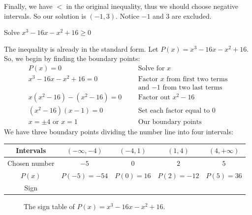 Finally, we have $<$ in the original inequality, thus we should choose negative intervals. So our solution is $(-1,3)$. Notice $-1$ and $3$ are excluded.
\begin{exa}
    Solve $x^3-16x-x^2+16 \ge 0$
\end{exa}
The inequality is already in the standard form. Let $P(x)=x^3-16x-x^2+16$. So, we begin by finding the boundary points:
\begin{align*}
        P(x) = 0&       &   &\text{Solve for $x$}\\
        x^3-16x-x^2+16=0&     &   &\text{Factor $x$ from first two terms} \\
        &   &   &\text{and $-1$ from two last terms}\\
        x(x^2-16)-(x^2-16)=0&   &   &\text{Factor out $x^2-16$}\\
        (x^2-16)(x-1) =0&        &   &\text{Set each factor equal to 0}\\
        x=\pm 4 \text{  or } x=1&  &   &\text{Our boundary points}
\end{align*}
We have three boundary points dividing the number line into four intervals:
\begin{table}[ht]
\centering
\begin{tabular}{c || c  c  c  c }
    \toprule
    Intervals     & $(-\infty,-4)$   & $(-4,1)$  & $(1,4)$ & $(4,+\infty)$\\[1.5pt]
    \hline \hline
    Chosen number & $-5$         &  $0$      &   $2$   & $5$\\
    $P(x)$        & $P(-5)=-54$  & $P(0)=16$ & $P(2)=-12$ & $P(5)=36$\\[1.5pt]
    Sign          &\circled{$-$} &\circled{$+$}&\circled{$-$}&\circled{$+$}
\end{tabular}
\end{table}
%
\begin{figure}[ht]   
    \centering
    \caption{The sign table of $P(x)=x^3-16x-x^2+16$.}
\end{figure}




